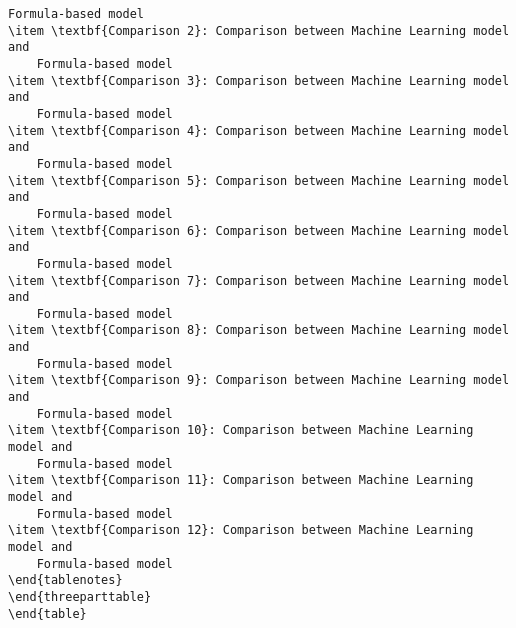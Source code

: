 \documentclass[11pt]{article}
\begin{document}
\begin{Verbatim}[tabsize=4]
	Formula-based model
\item \textbf{Comparison 2}: Comparison between Machine Learning model and
	Formula-based model
\item \textbf{Comparison 3}: Comparison between Machine Learning model and
	Formula-based model
\item \textbf{Comparison 4}: Comparison between Machine Learning model and
	Formula-based model
\item \textbf{Comparison 5}: Comparison between Machine Learning model and
	Formula-based model
\item \textbf{Comparison 6}: Comparison between Machine Learning model and
	Formula-based model
\item \textbf{Comparison 7}: Comparison between Machine Learning model and
	Formula-based model
\item \textbf{Comparison 8}: Comparison between Machine Learning model and
	Formula-based model
\item \textbf{Comparison 9}: Comparison between Machine Learning model and
	Formula-based model
\item \textbf{Comparison 10}: Comparison between Machine Learning model and
	Formula-based model
\item \textbf{Comparison 11}: Comparison between Machine Learning model and
	Formula-based model
\item \textbf{Comparison 12}: Comparison between Machine Learning model and
	Formula-based model
\end{tablenotes}
\end{threeparttable}
\end{table}

\end{Verbatim}




\end{document}
